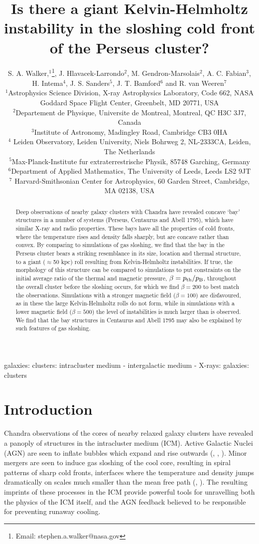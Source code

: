 \documentclass[useAMS,usenatbib]{mn2e}
\title[Bays in clusters]{Is there a giant Kelvin-Helmholtz instability in the sloshing cold front of the Perseus cluster?}
\author[S. A. Walker et al] {\parbox[]{6.5in}{{
      S. A. Walker,$^1$\thanks{Email: 
    stephen.a.walker@nasa.gov}, J. Hlavacek-Larrondo$^2$, 
    M. Gendron-Marsolais$^2$, A. C. Fabian$^3$,
     H. Intema$^4$, J. S. Sanders$^5$, J. T. Bamford$^6$ and
    R. van Weeren$^7$ 
    }\\
     \footnotesize
     $^1$Astrophysics Science Division, X-ray Astrophysics Laboratory, Code 662, NASA Goddard Space Flight Center, Greenbelt, MD 20771, USA \\
$^2$Departement de Physique, Universite de Montreal, Montreal, QC H3C 3J7,
Canada \\
       $^3$Institute of Astronomy, Madingley Road, Cambridge CB3 0HA \\
      $^4$ Leiden Observatory, Leiden University, Niels Bohrweg 2, NL-2333CA,
Leiden, The Netherlands \\
  $^5$Max-Planck-Institute fur extraterrestrische Physik, 85748 Garching, 
Germany  \\
$^6$Department of Applied Mathematics, The University of Leeds, Leeds LS2 9JT \\
$^7$ Harvard-Smithsonian Center for Astrophysics, 60 Garden Street, Cambridge, MA 02138, USA \\
    }}
\date{}
\begin{document}
\maketitle

\begin{abstract}
Deep observations of nearby galaxy clusters with Chandra have revealed concave
`bay' structures in a number of systems (Perseus, Centaurus and Abell 1795),
which have similar X-ray and radio properties. These bays have all the properties of cold fronts, where the temperature rises and density falls sharply, but are 
concave rather than convex. By comparing to simulations of gas
sloshing, we find that the bay in the Perseus cluster bears a striking
resemblance in its size, location and thermal structure, to a giant ($\approx$50 kpc) roll resulting
from Kelvin-Helmholtz instabilities. If true, the morphology of this structure
can be compared to simulations to put constraints on the initial average ratio of the thermal
and magnetic pressure, $\beta= p_{\rm th} / p_{\rm B}$, throughout the overall cluster before the sloshing occurs, for which we find
$\beta=200$ to best match the observations. Simulations with a stronger magnetic field ($\beta=100$) are disfavoured, as in these the large Kelvin-Helmholtz rolls do not form,
while in simulations with a lower magnetic field ($\beta=500$) the level of instabilities is much larger than is observed. We find that the bay structures in Centaurus and Abell 1795 may also be explained by such features of gas sloshing.
\end{abstract}

\begin{keywords}
galaxies: clusters: intracluster medium - intergalactic medium
- X-rays: galaxies: clusters
\end{keywords}

\section{Introduction}
Chandra observations of the cores of nearby relaxed galaxy clusters have
revealed a panoply of structures in the intracluster medium (ICM). Active
Galactic Nuclei (AGN) are seen to inflate bubbles which expand and rise
outwards (\citealt{Fabian2000}, \citealt{McNamara2000}, \citealt{Fabian2012}).
Minor mergers are seen to induce gas sloshing of the cool core,
resulting in spiral patterns of sharp cold fronts, interfaces where the
temperature and density jumps dramatically on scales much smaller than the mean
free path (\citealt{Markevitch2000}, \citealt{Markevitch2007}). The resulting
imprints of these processes in the ICM provide powerful
tools for unravelling both the physics of the ICM itself, and the AGN feedback
believed to be responsible for preventing runaway cooling. 
\end{document}
